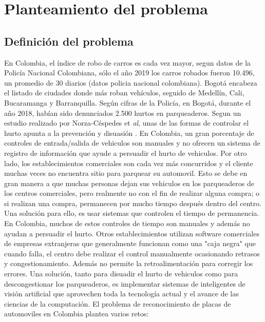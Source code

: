 \chapter{Planteamiento del problema}

\section{Definición del problema}
En Colombia, el índice de robo de carros es cada vez mayor, segun datos de la Policía Nacional Colombiana, sólo el año 2019 los carros robados fueron 10.496, un promedio de 30 diarios (datos policia nacional colombiana). Bogotá encabeza el listado de ciudades donde más roban vehículos, seguido de Medellín, Cali, Bucaramanga y Barranquilla. Según cifras de la Policía, en Bogotá, durante el año 2018, habían sido denunciados 2.500 hurtos en parqueaderos. 
Segun un estudio realizado por Norza-Céspedes et \textit{al}, unas de las formas de controlar el hurto apunta a la prevención y disuasión \cite{PolNal}. En Colombia, un gran porcentaje de controles de entrada/salida de vehiculos son manuales y no ofrecen un sistema de registro de información que ayude a persuadir el hurto de vehiculos. 
Por otro lado, los establecimientos comerciales son cada vez más concurridos y el cliente muchas veces no encuentra sitio para parquear su automovil. Esto se debe en gran manera a que muchas personas dejan sus vehiculos en los parqueaderos de los centros comerciales, pero realmente no con el fin de realizar alguna compra; o si realizan una compra, permanecen por mucho tiempo después dentro del centro. Una solución para ello, es usar sistemas que controlen el tiempo de permanencia. En Colombia, muchos de estos controles de tiempo son manuales y además no ayudan a persuadir el hurto. Otros establecimientos utilizan software comerciales de empresas extranjeras que generalmente funcionan como una "caja negra" que cuando falla, el centro debe realizar el control manualmente ocasionando retrasos y congestionamiento. Además no permite la retroalimentación para corregir los errores. 
Una solución, tanto para disuadir el hurto de vehiculos como para descongestionar los parqueaderos, es implementar sistemas de inteligentes de visión artificial que aprovechen toda la tecnología actual y el avance de las ciencias de la computación. 
El problema de reconocimiento de placas de automoviles en Colombia plantea varios retos:
